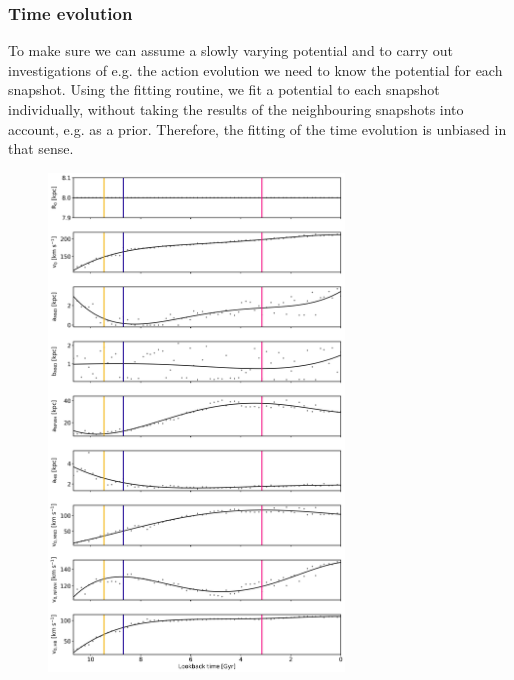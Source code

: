 \subsubsection{Time evolution}
To make sure we can assume a slowly varying potential and to carry out investigations of e.g. the action evolution we need to know the potential for each snapshot. Using the fitting routine, we fit  a potential to each snapshot individually, without taking the results of the neighbouring snapshots into account, e.g. as a prior. Therefore, the fitting of the time evolution is unbiased in that sense. 
\begin{figure}%
\captionsetup{format=plain}
\centering
\includegraphics[width=0.7\textwidth]{plots/Auriga/fitted_potential_evolution_jan19.png}

\end{figure}
